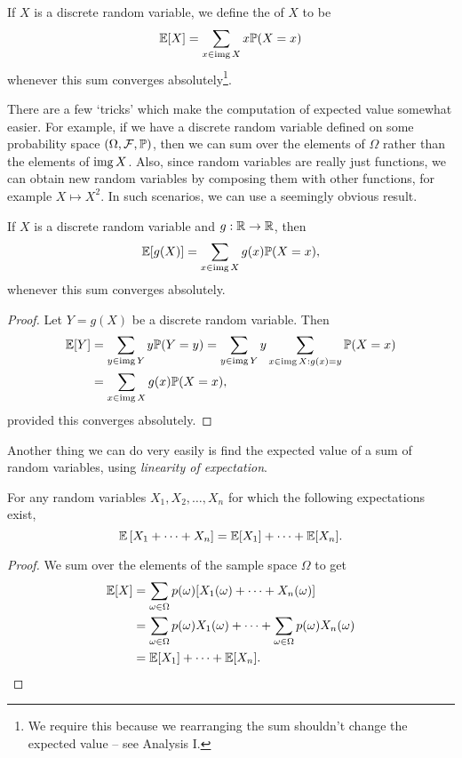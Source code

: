 \documentclass[10pt, a4paper]{article}
\begin{document}
\begin{definition}
	If $X$ is a discrete random variable, we define the  of $X$ to be
	$$
\mathbb{E}[X] = \sum_{x \in \operatorname{img} X} x \mathbb{P}(X = x)
	$$
	whenever this sum converges absolutely\footnote{We require this because we rearranging the sum shouldn't change the expected value -- see Analysis I.}.
\end{definition}

There are a few `tricks' which make the computation of expected value somewhat easier. For example, if we have a discrete random variable defined on some probability space $(\Omega, \mathcal{F}, \mathbb{P})$, then we can sum over the elements of $\Omega$ rather than the elements of $\operatorname{img} X$.
Also, since random variables are really just functions, we can obtain new random variables by composing them with other functions, for example $X \mapsto X^2$. In such scenarios, we can use a seemingly obvious result.

\begin{theorem}
	If $X$ is a discrete random variable and $g: \mathbb{R} \rightarrow \mathbb{R}$, then
	$$
\mathbb{E}[g(X)] = \sum_{x \in \operatorname{img} X} g(x) \mathbb{P}(X = x),
	$$
	whenever this sum converges absolutely.
\end{theorem}
\begin{proof}
	Let $Y = g(X)$ be a discrete random variable. Then
	\begin{align*}
		\mathbb{E}[Y] &= \sum_{y \in \operatorname{img} Y} y \mathbb{P}(Y = y) = \sum_{y \in \operatorname{img} Y} y \sum_{x \in \operatorname{img} X : g(x) = y} \mathbb{P}(X = x)  \\
		&= \sum_{x \in \operatorname{img} X} g(x) \mathbb{P}(X = x),
	\end{align*}
	provided this converges absolutely.
\end{proof}

Another thing we can do very easily is find the expected value of a sum of random variables, using \emph{linearity of expectation}.

\begin{theorem}
	For any random variables $X_1, X_2, \dots, X_n$ for which the following expectations exist,
	$$
\mathbb{E}\left[X_1 + \cdots + X_n\right]= \mathbb{E}[X_1] + \cdots + \mathbb{E}[X_n].
	$$
\end{theorem}
\begin{proof}
	We sum over the elements of the sample space $\Omega$ to get
	\begin{align*}
		\mathbb{E}[X] &= \sum_{\omega \in \Omega} p(\omega)[X_1(\omega) + \cdots + X_n(\omega)]\\
		&= \sum_{\omega \in \Omega} p(\omega) X_1(\omega) + \cdots + \sum_{\omega \in \Omega} p(\omega) X_n(\omega)\\&= \mathbb{E}[X_1] + \cdots + \mathbb{E}[X_n].
	\end{align*}
\end{proof}
\end{document}
